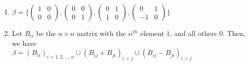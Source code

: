 \documentclass[13pt]{article}
\begin{document}
\begin{enumerate}[label=(\alph*),leftmargin=*]
\item $\beta = \bigg\{
    \begin{pmatrix}
      1 & 0 \\
      0 & 0
    \end{pmatrix},
    \begin{pmatrix}
      0 & 0 \\
      0 & 1 
    \end{pmatrix},
    \begin{pmatrix}
      0 & 1 \\
      1 & 0
    \end{pmatrix},
    \begin{pmatrix}
      0 & 1 \\
      -1 & 0
    \end{pmatrix}\bigg\}
  $

\item Let $B_{ii}$ be the $n \times n$ matrix with the $ii^{th}$ element $1$, and all others $0$. Then, we have \\
  $\beta = (B_{ii})_{i = 1, 2, \ldots, n} \cup (B_{ij} + B_{ji})_{i > j} \cup (B_{ij} - B_{ji})_{i > j}$
\end{enumerate}





\newpage
\end{document}
